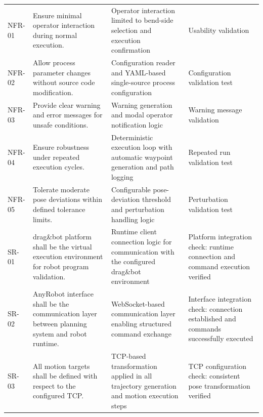 \begin{table}[htbp]
\begin{tabularx}{\textwidth}{
L{1.4cm}
L{4.2cm}
L{5.2cm}
L{3.2cm}
}
NFR-01 &
Ensure minimal operator interaction during normal execution. &
Operator interaction limited to bend-side selection and execution confirmation &
Usability validation \\

NFR-02 &
Allow process parameter changes without source code modification. &
Configuration reader and YAML-based single-source process configuration &
Configuration validation test \\

NFR-03 &
Provide clear warning and error messages for unsafe conditions. &
Warning generation and modal operator notification logic &
Warning message validation \\

NFR-04 &
Ensure robustness under repeated execution cycles. &
Deterministic execution loop with automatic waypoint generation and path logging &
Repeated run validation test \\

NFR-05 &
Tolerate moderate pose deviations within defined tolerance limits. &
Configurable pose-deviation threshold and perturbation handling logic &
Perturbation validation test \\

SR-01 &
drag\&bot platform shall be the virtual execution environment for robot program validation. &
Runtime client connection logic for communication with the configured drag\&bot environment &
Platform integration check: runtime connection and command execution verified \\

SR-02 &
AnyRobot interface shall be the communication layer between planning system and robot runtime. &
WebSocket-based communication layer enabling structured command exchange &
Interface integration check: connection established and commands successfully executed \\

SR-03 &
All motion targets shall be defined with respect to the configured TCP. &
TCP-based transformation applied in all trajectory generation and motion execution steps &
TCP configuration check: consistent pose transformation verified \\

\bottomrule
\end{tabularx}
\end{table}

